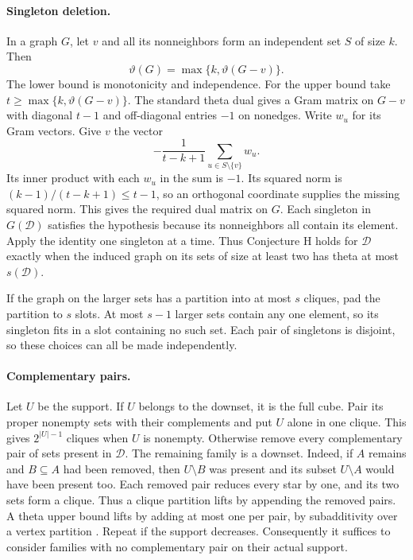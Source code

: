 \documentclass[10pt]{article}
\begin{document}
\paragraph{Singleton deletion.}
In a graph $G$, let $v$ and all its nonneighbors form an independent set
$S$ of size $k$. Then
\[
\vartheta(G)=\max\{k,\vartheta(G-v)\}.
\]
The lower bound is monotonicity and independence. For the upper bound take
$t\geq\max\{k,\vartheta(G-v)\}$. The standard theta dual gives a Gram matrix
on $G-v$ with diagonal $t-1$ and off-diagonal entries $-1$ on nonedges.
Write $w_u$ for its Gram vectors. Give $v$ the vector
\[
-\frac{1}{t-k+1}\sum_{u\in S\setminus\{v\}}w_u.
\]
Its inner product with each $w_u$ in the sum is $-1$. Its squared norm is
$(k-1)/(t-k+1)\leq t-1$, so an orthogonal coordinate supplies the missing
squared norm. This gives the required dual matrix on $G$. Each singleton
in $G(\mathcal D)$ satisfies the hypothesis because its nonneighbors all
contain its element. Apply the identity one singleton at a time. Thus
Conjecture H holds for $\mathcal D$ exactly when the induced graph on its
sets of size at least two has theta at most $s(\mathcal D)$.

If the graph on the larger sets has a partition into at most $s$ cliques,
pad the partition to $s$ slots. At most $s-1$ larger sets contain any one
element, so its singleton fits in a slot containing no such set. Each pair
of singletons is disjoint, so these choices can all be made independently.

\paragraph{Complementary pairs.}
Let $U$ be the support. If $U$ belongs to the downset, it is the full cube.
Pair its proper nonempty sets with their complements and put $U$ alone in
one clique. This gives $2^{|U|-1}$ cliques when $U$ is nonempty. Otherwise
remove every complementary pair of sets present in $\mathcal D$. The
remaining family is a downset. Indeed, if $A$ remains and $B\subseteq A$
had been removed, then $U\setminus B$ was present and its subset
$U\setminus A$ would have been present too. Each removed pair reduces every
star by one, and its two sets form a clique. Thus a clique partition lifts
by appending the removed pairs. A theta upper bound lifts by adding at most
one per pair, by subadditivity over a vertex partition \cite{lovasz}.
Repeat if the support decreases. Consequently it suffices to consider
families with no complementary pair on their actual support.
\end{document}
